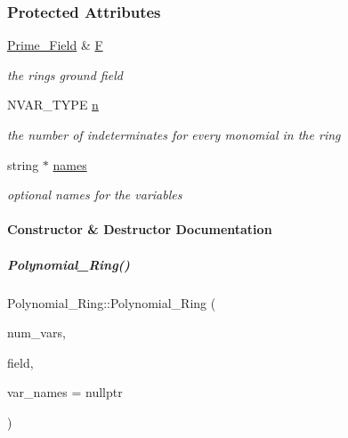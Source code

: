 \subsubsection*{Protected Attributes}
\begin{DoxyCompactItemize}
\item 
\mbox{\label{group__polygroup_a99cdb13a26bf70032c19fe01a3cea1d8}} 
\hyperlink{group___fields_group_class_prime___field}{Prime\+\_\+\+Field} \& \hyperlink{group__polygroup_a99cdb13a26bf70032c19fe01a3cea1d8}{F}
\begin{DoxyCompactList}\small\item\em the ring\textquotesingle{}s ground field \end{DoxyCompactList}\item 
N\+V\+A\+R\+\_\+\+T\+Y\+PE \hyperlink{group__polygroup_abf753b41b3e84bd8e32de314f15f7826}{n}
\begin{DoxyCompactList}\small\item\em the number of indeterminates for every monomial in the ring \end{DoxyCompactList}\item 
\mbox{\label{group__polygroup_ad7634678157b109f713da3a712f2af35}} 
string $\ast$ \hyperlink{group__polygroup_ad7634678157b109f713da3a712f2af35}{names}
\begin{DoxyCompactList}\small\item\em optional names for the variables \end{DoxyCompactList}\end{DoxyCompactItemize}


\paragraph{Constructor \& Destructor Documentation}
\mbox{\label{group__polygroup_af62688669a31cb720bb1e90a724daa4f}} 
\subparagraph{\texorpdfstring{Polynomial\+\_\+\+Ring()}{Polynomial\_Ring()}}
{\footnotesize\ttfamily Polynomial\+\_\+\+Ring\+::\+Polynomial\+\_\+\+Ring (\begin{DoxyParamCaption}\item[{N\+V\+A\+R\+\_\+\+T\+Y\+PE}]{num\+\_\+vars,  }\item[{\hyperlink{group___fields_group_class_prime___field}{Prime\+\_\+\+Field} \&}]{field,  }\item[{string $\ast$}]{var\+\_\+names = {\ttfamily nullptr} }\end{DoxyParamCaption})}



